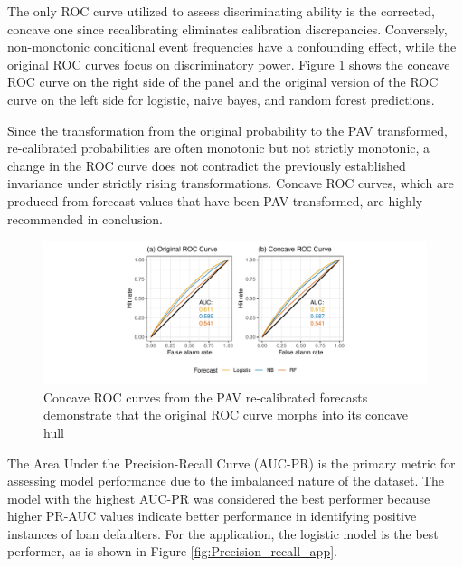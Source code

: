 \documentclass[a4paper,12pt]{article}
\numberwithin{equation}{section}
\begin{document}
  The only ROC curve utilized to assess discriminating ability is the corrected, concave one since recalibrating eliminates calibration discrepancies. Conversely, non-monotonic conditional event frequencies have a confounding effect, while the original ROC curves focus on discriminatory power. Figure \ref{fig:roc_app} shows the concave ROC curve on the right side of the panel and the original version of the ROC curve on the left side for logistic, naive bayes, and random forest predictions.\bigskip 
  
  Since the transformation from the original probability to the PAV transformed, re-calibrated probabilities are often monotonic but not strictly monotonic, a change in the ROC curve does not contradict the previously established invariance under strictly rising transformations. Concave ROC curves, which are produced from forecast values that have been PAV-transformed, are highly recommended in conclusion.

  \begin{figure}[ht]
   \centering
   \includegraphics[scale=0.7]{Plots_app/ROC.pdf}
   \caption{Concave ROC curves from the PAV re-calibrated forecasts demonstrate that the original ROC curve morphs into its concave hull}
   \label{fig:roc_app}
  \end{figure}

 The Area Under the Precision-Recall Curve (AUC-PR) is the primary metric for assessing model performance due to the imbalanced nature of the dataset. The model with the highest AUC-PR was considered the best performer because higher PR-AUC values indicate better performance in identifying positive instances of loan defaulters. For the application, the logistic model is the best performer, as is shown in Figure \ref{fig:Precision_recall_app}. 
  
\end{document}
